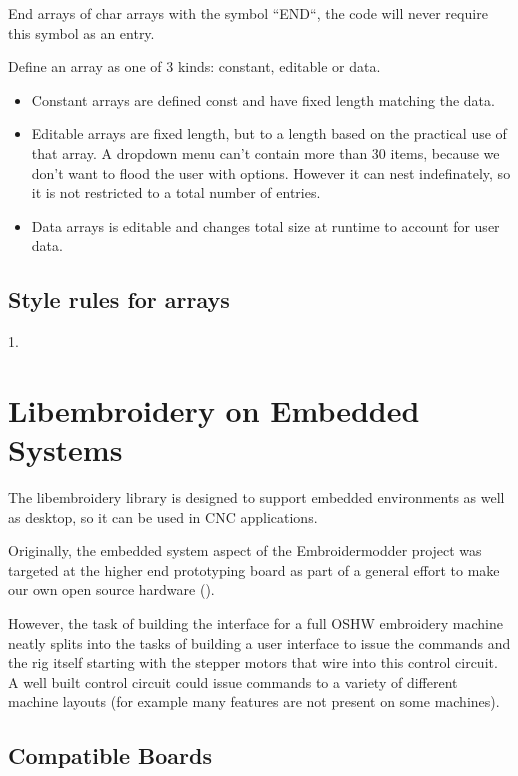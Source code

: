 \documentclass[10pt]{report}
\begin{document}
End arrays of char arrays with the symbol ``END``, the code will never require
this symbol as an entry.

Define an array as one of 3 kinds: constant, editable or data.

\begin{itemize}
\item Constant arrays are defined const and have fixed length matching the data.
\item Editable arrays are fixed length, but to a length based on the practical use
  of that array. A dropdown menu can't contain more than 30 items, because we
  don't want to flood the user with options. However it can nest indefinately,
  so it is not restricted to a total number of entries.
\item Data arrays is editable and changes total size at runtime to account for user data.
\end{itemize}

\section{Style rules for arrays}

1.

\chapter{Libembroidery on Embedded Systems}

The libembroidery library is designed to support embedded environments as well
as desktop, so it can be used in CNC applications.

Originally, the embedded system aspect of the Embroidermodder project was
targeted at the higher end  prototyping board as part
of a general effort to make our own open source hardware ().

However, the task of building the interface for a full OSHW embroidery machine
neatly splits into the tasks of building a user interface to issue the
commands and the rig itself starting with the stepper motors that wire into
this control circuit. A well built control circuit could issue commands to
a variety of different machine layouts (for example many features are not
present on some machines).

\section{Compatible Boards}
\end{document}
